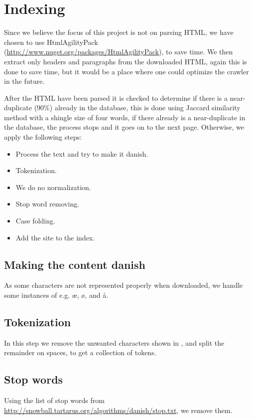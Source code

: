 \section{Indexing}
Since we believe the focus of this project is not on parsing HTML, we have chosen to use HtmlAgilityPack (\url{http://www.nuget.org/packages/HtmlAgilityPack}), to save time. We then extract only headers and paragraphs from the downloaded HTML, again this is done to save time, but it would be a place where one could optimize the crawler in the future.

After the HTML have been parsed it is checked  to determine if there is a near-duplicate (90\%) already in the database, this is done using Jaccard similarity method with a shingle size of four words, if there already is a near-duplicate in the database, the process stops and it goes on to the next page. Otherwise, we apply the following steps:

\begin{itemize}
    \item Process the text and try to make it danish.
	\item Tokenization.
    \item We do no normalization.
	\item Stop word removing.
	\item Case folding.
    \item Add the site to the index.
\end{itemize}

\subsection{Making the content danish}
As some characters are not represented properly when downloaded, we handle some instances of e.g. æ, ø, and å.

\subsection{Tokenization}
In this step we remove the unwanted characters shown in , and split the remainder on spaces, to get a collection of tokens.

\subsection{Stop words}
Using the list of stop words from \url{http://snowball.tartarus.org/algorithms/danish/stop.txt}, we remove them.

